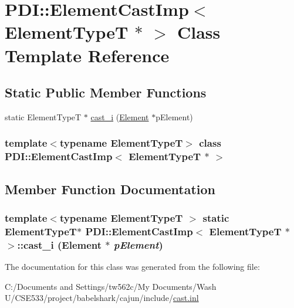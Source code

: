 \hypertarget{class_p_d_i_1_1_element_cast_imp_3_01_element_type_t_01_5_01_4}{
\section{PDI::ElementCastImp$<$ ElementTypeT $\ast$ $>$ Class Template Reference}
\label{class_p_d_i_1_1_element_cast_imp_3_01_element_type_t_01_5_01_4}
}
\subsection*{Static Public Member Functions}
\begin{CompactItemize}
\item 
static ElementTypeT $\ast$ \hyperlink{class_p_d_i_1_1_element_cast_imp_3_01_element_type_t_01_5_01_4_dccd05ebdd9eb95bdf610499dd07f979}{cast\_\-i} (\hyperlink{class_p_d_i_1_1_element}{Element} $\ast$pElement)
\end{CompactItemize}
\subsubsection*{template$<$typename ElementTypeT$>$ class PDI::ElementCastImp$<$ ElementTypeT $\ast$ $>$}



\subsection{Member Function Documentation}
\hypertarget{class_p_d_i_1_1_element_cast_imp_3_01_element_type_t_01_5_01_4_dccd05ebdd9eb95bdf610499dd07f979}{
\subsubsection[{cast\_\-i}]{\setlength{\rightskip}{0pt plus 5cm}template$<$typename ElementTypeT $>$ static ElementTypeT$\ast$ PDI::ElementCastImp$<$ ElementTypeT $\ast$ $>$::cast\_\-i ({\bf Element} $\ast$ {\em pElement})}}
\label{class_p_d_i_1_1_element_cast_imp_3_01_element_type_t_01_5_01_4_dccd05ebdd9eb95bdf610499dd07f979}




The documentation for this class was generated from the following file:\begin{CompactItemize}
\item 
C:/Documents and Settings/tw562c/My Documents/Wash U/CSE533/project/babelshark/cajun/include/\hyperlink{cast_8inl}{cast.inl}\end{CompactItemize}

